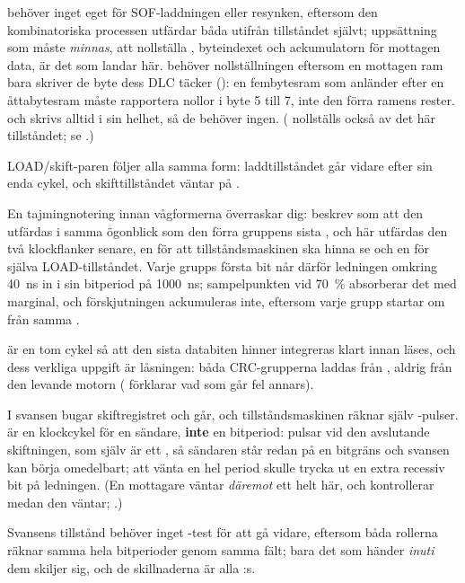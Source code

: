  behöver inget eget för SOF-laddningen eller resynken, eftersom den kombinatoriska
processen utfärdar båda utifrån tillståndet självt; uppsättning som måste \emph{minnas}, att
nollställa , byteindexet och ackumulatorn för mottagen data, är det som landar här.
 behöver nollställningen eftersom en mottagen ram bara skriver de byte dess DLC
täcker (): en fembytesram som anländer efter en åttabytesram måste rapportera nollor
i byte 5 till 7, inte den förra ramens rester.  och  skrivs alltid
i sin helhet, så de behöver ingen. ( nollställs också av det här tillståndet; se
.)

LOAD/skift-paren följer alla samma form: laddtillståndet går vidare efter sin enda cykel, och
skifttillståndet väntar på .

\begin{aside}
En tajmingnotering innan vågformerna överraskar dig:  beskrev  som att den
utfärdas i samma ögonblick som den förra gruppens sista , och här utfärdas den två
klockflanker senare, en för att tillståndsmaskinen ska hinna se  och en för själva
LOAD-tillståndet. Varje grupps första bit når därför ledningen omkring 40~ns in i sin bitperiod på
1000~ns; sampelpunkten vid 70~\% absorberar det med marginal, och förskjutningen ackumuleras inte,
eftersom varje grupp startar om från samma .
\end{aside}

 är en tom cykel så att den sista databiten hinner integreras klart innan
 läses, och dess verkliga uppgift är låsningen: båda CRC-grupperna laddas från
, aldrig från den levande motorn ( förklarar vad som går fel
annars).

I svansen bugar skiftregistret och går, och tillståndsmaskinen räknar själv -pulser.
 är en klockcykel för en sändare, \textbf{inte} en bitperiod:
 pulsar vid den avslutande skiftningen, som själv är ett , så
sändaren står redan på en bitgräns och svansen kan börja omedelbart; att vänta en hel period skulle
trycka ut en extra recessiv bit på ledningen. (En mottagare väntar \emph{däremot} ett helt
 här, och kontrollerar  medan den väntar; .)

Svansens tillstånd behöver inget -test för att gå vidare, eftersom båda rollerna räknar
samma hela bitperioder genom samma fält; bara det som händer \emph{inuti} dem skiljer sig, och de
skillnaderna är alla :s.

